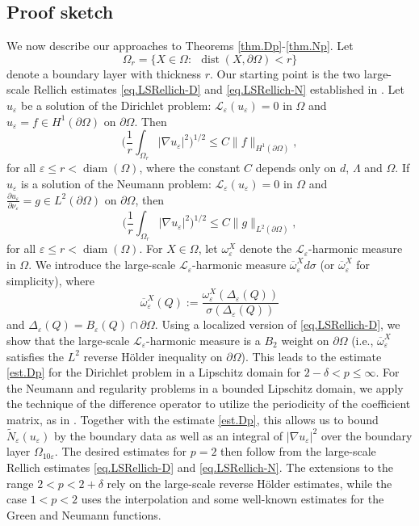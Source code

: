 \documentclass[reqno,12pt]{amsart} %
\theoremstyle{definition}
\theoremstyle{remark}
\numberwithin{equation}{section}
\newcommand{\cL}{\mathcal{L}}
\newcommand{\e}{\varepsilon}
\DeclareMathOperator{\diam}{diam}
\DeclareMathOperator{\dist}{dist}
\begin{document}
\subsection{Proof sketch}
We now describe our approaches to Theorems \ref{thm.Dp}-\ref{thm.Np}.
Let 
$$
\Omega_r = \big\{X \in \Omega:\ \  \dist(X, \partial \Omega) < r \big\}
$$
denote a boundary layer with thickness $r$.
Our starting point is the two large-scale Rellich estimates
\eqref{eq.LSRellich-D} and \eqref{eq.LSRellich-N} established in \cite{KS11, Shen17}.
Let $u_\e$ be a  solution of the Dirichlet problem:
$\mathcal{L}_\e (u_\e)=0$ in $\Omega$ and $u_\e =f \in H^1(\partial\Omega)$
on $\partial \Omega$. Then
\begin{equation}\label{eq.LSRellich-D}
    \bigg( \frac{1}{r} \int_{\Omega_r} |\nabla u_\e|^2 \bigg)^{1/2} \le C  \| f \|_{H^1(\partial \Omega)},
\end{equation}
for all $\e \le r < \diam(\Omega)$, where
 the constant $C$ depends only on $d$, $\Lambda$ and $\Omega$.  
 If $u_\e$ is a  solution of the Neumann problem:
 $\cL_\e(u_\e)=0 $ in $\Omega$ and 
 $\frac{\partial u_\e}{\partial \nu_\e} =g \in L^2(\partial\Omega)$
 on $\partial\Omega$,
 then 
\begin{equation}\label{eq.LSRellich-N}
    \bigg( \frac{1}{r} \int_{\Omega_r} |\nabla u_\e|^2 \bigg)^{1/2} \le C \| g \|_{L^2(\partial \Omega)},
\end{equation}
for all $\e \le r< \diam(\Omega)$.
For $X\in \Omega$, let $\omega_\e^X $ denote the $\cL_\e$-harmonic 
measure in $\Omega$.
We introduce the large-scale $\cL_\e$-harmonic measure $\overline{\omega}^X_\e d \sigma$ (or $\overline{\omega}^X_\e$ for simplicity), where
$$
    \overline{\omega}^X_\e(Q) := \frac{\omega_\e^X(\Delta_\e(Q))}{\sigma(\Delta_\e(Q))}
$$
and $\Delta_\e (Q)=B_\e(Q)\cap \partial \Omega$.
Using a localized version of \eqref{eq.LSRellich-D},
we  show that the large-scale $\cL_\e$-harmonic 
measure is a $B_2$ weight on $\partial\Omega$ (i.e., $\overline{\omega}^X_\e$ satisfies the $L^2$ reverse H\"{o}lder inequality on $\partial\Omega$).
This leads to the estimate \eqref{est.Dp} for the Dirichlet problem in a Lipschitz domain for
$2-\delta < p\le \infty$.
For the Neumann and regularity problems in a bounded Lipschitz domain, we apply the technique of the difference operator to utilize the 
periodicity of the coefficient matrix, as in \cite{KS11}.
Together with the estimate \eqref{est.Dp}, this allows us to bound $\widetilde{N}_\e (u_\e)$ by the boundary data as well as an integral of $|\nabla u_\e|^2$
over the boundary layer $\Omega_{10\e}$.
The desired estimates for $p=2$ then follow from the large-scale Rellich 
estimates \eqref{eq.LSRellich-D} and \eqref{eq.LSRellich-N}.
The extensions to the range $2<p< 2+\delta$
rely on  the large-scale reverse H\"older estimates, 
while the case $1< p< 2$ uses the interpolation and some well-known estimates
for the Green and Neumann functions. 
\end{document}
